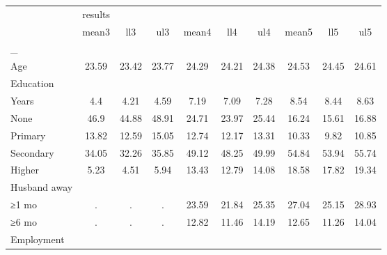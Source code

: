 \begin{tabular}{l*{9}{c}}
\toprule
                    &     results&            &            &            &            &            &            &            &            \\
                    &       mean3&         ll3&         ul3&       mean4&         ll4&         ul4&       mean5&         ll5&         ul5\\
\midrule
\_                   &            &            &            &            &            &            &            &            &            \\
Age                 &       23.59&       23.42&       23.77&       24.29&       24.21&       24.38&       24.53&       24.45&       24.61\\
\midrule
Education           &            &            &            &            &            &            &            &            &            \\
Years               &         4.4&        4.21&        4.59&        7.19&        7.09&        7.28&        8.54&        8.44&        8.63\\
None                &        46.9&       44.88&       48.91&       24.71&       23.97&       25.44&       16.24&       15.61&       16.88\\
Primary             &       13.82&       12.59&       15.05&       12.74&       12.17&       13.31&       10.33&        9.82&       10.85\\
Secondary           &       34.05&       32.26&       35.85&       49.12&       48.25&       49.99&       54.84&       53.94&       55.74\\
Higher              &        5.23&        4.51&        5.94&       13.43&       12.79&       14.08&       18.58&       17.82&       19.34\\
\midrule
Husband away        &            &            &            &            &            &            &            &            &            \\
≥1 mo               &           .&           .&           .&       23.59&       21.84&       25.35&       27.04&       25.15&       28.93\\
≥6 mo               &           .&           .&           .&       12.82&       11.46&       14.19&       12.65&       11.26&       14.04\\
\midrule
Employment          &            &            &            &            &            &            &            &            &            \\

\end{tabular}
